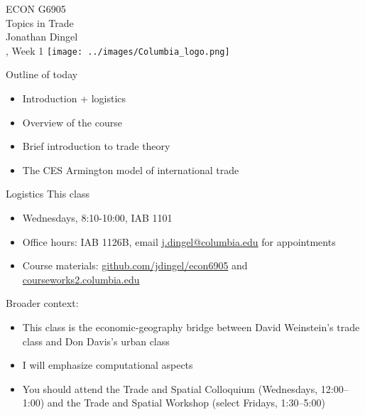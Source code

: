\documentclass[10pt,notes=hide,aspectratio=169]{beamer}
\begin{document}
\begin{frame}[plain]
\begin{center}
\large
\textcolor{columbiadarkblue}{ECON G6905\\
Topics in Trade\\ 
Jonathan Dingel\\
\semester, Week 1}
\vfill 
\texttt{[image: ../images/Columbia\_logo.png]}
\end{center}
\end{frame}
\begin{frame}{Outline of today}
\begin{itemize}
	\item Introduction + logistics
	\item Overview of the course
	\item Brief introduction to trade theory
	\item The CES Armington model of international trade
\end{itemize}
\end{frame}
\begin{frame}{Logistics}
This class
\begin{itemize}
\item Wednesdays, 8:10-10:00, IAB 1101
\item Office hours: IAB 1126B, email \href{mailto:j.dingel@columbia.edu}{j.dingel@columbia.edu} for appointments
\item Course materials:
\href{http://github.com/jdingel/econ6905}{github.com/jdingel/econ6905}
and \href{https://courseworks2.columbia.edu}{courseworks2.columbia.edu}
\end{itemize}
Broader context:
\begin{itemize}
\item This class is the economic-geography bridge between David Weinstein's trade class and Don Davis's urban class
\item I will emphasize computational aspects
\item You should attend the Trade and Spatial Colloquium (Wednesdays, 12:00--1:00) %
and the Trade and Spatial Workshop (select Fridays, 1:30--5:00) %
\end{itemize}
\end{frame}
\end{document}
